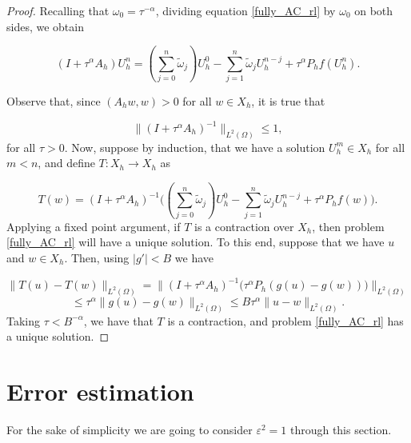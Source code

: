 \documentclass{amsart}
\newcommand{\ele}{L^2(\Omega)}
\newcommand{\w}{\omega}
\newcommand{\W}{\Omega}
\newcommand{\eps}{\varepsilon}
\newcommand{\wtilde}{\tilde{\w}}
\newcommand{\fmonio}{g}
\theoremstyle{remark}
\theoremstyle{definition}
\numberwithin{equation}{section}
\begin{document}
\begin{proof}
Recalling that $\w_0 = \tau^{-\alpha}$, dividing equation \eqref{fully_AC_rl} by $\w_0$ on both sides, we obtain 

\begin{equation} 
     (I  +  \tau^{\alpha}A_h) U_h^n  =  \left(\sum_{j=0}^{n}\wtilde_j \right)U_h^{0} - \sum^n_{j=1}\wtilde_j U_h^{n-j} +  \tau^{\alpha}P_h f(U_h^n).
\label{fully_disc}
\end{equation}


Observe that, since $(A_h w , w) > 0$ for all $w \in X_h$, it is true that 

$$\|(I  +  \tau^{\alpha}A_h)^{-1}\|_{L^2(\W)} \leq 1,$$
for all $\tau>0$.  
Now, suppose by induction, that we have a solution $U^m_h \in X_h$ for all $m < n$, and define $T: X_h \to X_h$ as

\begin{equation} 
      T(w)  = (I  +  \tau^{\alpha}A_h)^{-1} \Big( \left(\sum_{j=0}^{n}\wtilde_j \right)U_h^{0} - \sum^n_{j=1}\wtilde_j U_h^{n-j} +  \tau^{\alpha}P_h f(w) \Big).
\label{fully_disc2}
\end{equation}
Applying a fixed point argument, if $T$ is a contraction over $X_h$, then problem \eqref{fully_AC_rl} will have a unique solution. To this end, suppose that we have $u$ and $w \in X_h$. Then, using $|\fmonio'|<B$ we have

$$\|T(u)-T(w)\|_{\ele} = \|(I  +  \tau^{\alpha}A_h)^{-1} \Big(\tau^{\alpha}P_h(\fmonio(u)-\fmonio(w)) \Big)\|_{\ele} $$ 
$$
\leq \tau^{\alpha}\| \fmonio(u) - \fmonio(w)\|_{\ele} \leq B\tau^{\alpha}\|u-w\|_{\ele}. 
$$
Taking $\tau < B^{-\alpha}$, we have that $T$ is a contraction, and problem \eqref{fully_AC_rl} has a unique solution.  \end{proof}

\section{Error estimation} \label{sec:error}

For the sake of simplicity we are going to consider $\eps^2 = 1$ through this section. 
\end{document}
